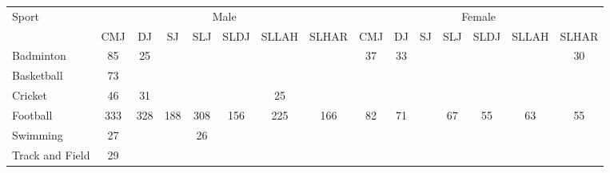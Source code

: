 \setlength{\tabcolsep}{3pt}
\begin{tabular}{lcccccccccccccc}
\toprule
Sport & \multicolumn{7}{c}{Male} & \multicolumn{7}{c}{Female} \\
\cmidrule(lr){2-8}\cmidrule(lr){9-15}
 & CMJ & DJ & SJ & SLJ & SLDJ & SLLAH & SLHAR & CMJ & DJ & SJ & SLJ & SLDJ & SLLAH & SLHAR \\
\midrule
Badminton & 85 & 25 &  &  &  &  &  & 37 & 33 &  &  &  &  & 30 \\
Basketball & 73 &  &  &  &  &  &  &  &  &  &  &  &  &  \\
Cricket & 46 & 31 &  &  &  & 25 &  &  &  &  &  &  &  &  \\
Football & 333 & 328 & 188 & 308 & 156 & 225 & 166 & 82 & 71 &  & 67 & 55 & 63 & 55 \\
Swimming & 27 &  &  & 26 &  &  &  &  &  &  &  &  &  &  \\
Track and Field & 29 &  &  &  &  &  &  &  &  &  &  &  &  &  \\
\bottomrule
\end{tabular}
\setlength{\tabcolsep}{6pt}
